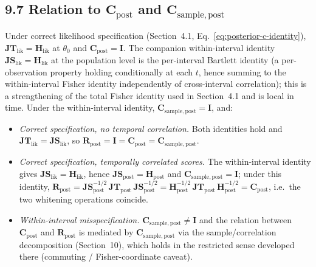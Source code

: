 \documentclass[11pt]{article}
\begin{document}
\subsection*{9.7 Relation to $\mathbf C_{\mathrm{post}}$ and $\mathbf C_{\mathrm{sample},\mathrm{post}}$}

Under correct likelihood specification (Section~4.1, Eq.\ \eqref{eq:posterior-c-identity}), $\mathbf{JT}_{\mathrm{lik}} = \mathbf H_{\mathrm{lik}}$ at $\theta_0$ and $\mathbf C_{\mathrm{post}} = \mathbf I$. The companion within-interval identity $\mathbf{JS}_{\mathrm{lik}} = \mathbf H_{\mathrm{lik}}$ at the population level is the per-interval Bartlett identity (a per-observation property holding conditionally at each $t$, hence summing to the within-interval Fisher identity independently of cross-interval correlation); this is a strengthening of the total Fisher identity used in Section~4.1 and is local in time. Under the within-interval identity, $\mathbf C_{\mathrm{sample},\mathrm{post}} = \mathbf I$, and:

\begin{itemize}
\item \emph{Correct specification, no temporal correlation.} Both identities hold and $\mathbf{JT}_{\mathrm{lik}} = \mathbf{JS}_{\mathrm{lik}}$, so $\mathbf R_{\mathrm{post}} = \mathbf I = \mathbf C_{\mathrm{post}} = \mathbf C_{\mathrm{sample},\mathrm{post}}$.
\item \emph{Correct specification, temporally correlated scores.} The within-interval identity gives $\mathbf{JS}_{\mathrm{lik}} = \mathbf H_{\mathrm{lik}}$, hence $\mathbf{JS}_{\mathrm{post}} = \mathbf H_{\mathrm{post}}$ and $\mathbf C_{\mathrm{sample},\mathrm{post}} = \mathbf I$; under this identity, $\mathbf R_{\mathrm{post}} = \mathbf{JS}_{\mathrm{post}}^{-1/2}\,\mathbf{JT}_{\mathrm{post}}\,\mathbf{JS}_{\mathrm{post}}^{-1/2} = \mathbf H_{\mathrm{post}}^{-1/2}\,\mathbf{JT}_{\mathrm{post}}\,\mathbf H_{\mathrm{post}}^{-1/2} = \mathbf C_{\mathrm{post}}$, i.e.\ the two whitening operations coincide.
\item \emph{Within-interval misspecification.} $\mathbf C_{\mathrm{sample},\mathrm{post}} \neq \mathbf I$ and the relation between $\mathbf C_{\mathrm{post}}$ and $\mathbf R_{\mathrm{post}}$ is mediated by $\mathbf C_{\mathrm{sample},\mathrm{post}}$ via the sample/correlation decomposition (Section~10), which holds in the restricted sense developed there (commuting / Fisher-coordinate caveat).
\end{itemize}
\end{document}
